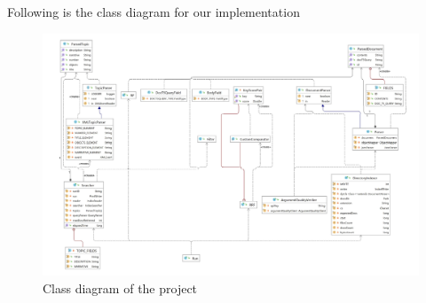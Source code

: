 Following is the class diagram for our implementation

\begin{figure}[h]
\centering
\includegraphics[width=\textwidth]{figure/class-diagram.PNG}
\caption{Class diagram of the project}
\end{figure}